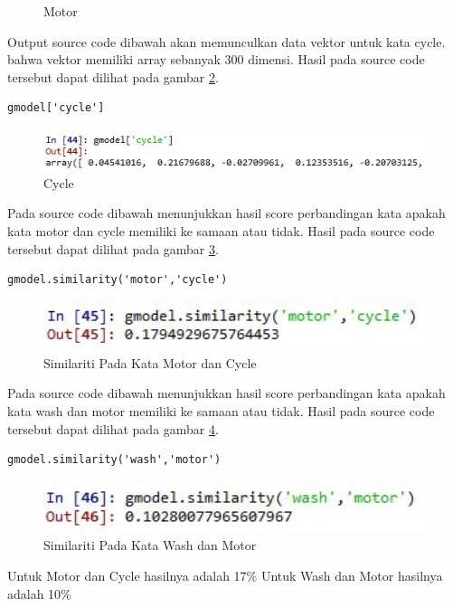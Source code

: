\begin{enumerate}
\begin{figure}[!htbp]
	\caption{Motor}
	\label{c5_16}
\end{figure}
\subitem Output source code dibawah akan memunculkan data vektor untuk kata cycle. bahwa vektor memiliki array sebanyak 300 dimensi. Hasil pada source code tersebut dapat dilihat pada gambar \ref{c5_17}.
\begin{verbatim}
gmodel['cycle']
\end{verbatim}
\begin{figure}[!htbp]
	\centerline{\includegraphics[width=1\textwidth]{figures/huda/chapter5/17.JPG}}
	\caption{Cycle}
	\label{c5_17}
\end{figure}
\subitem Pada source code dibawah menunjukkan hasil score perbandingan kata apakah kata motor dan cycle memiliki ke samaan atau tidak.  Hasil pada source code tersebut dapat dilihat pada gambar \ref{c5_18}.
\begin{verbatim}
gmodel.similarity('motor','cycle')
\end{verbatim}
\begin{figure}[!htbp]
	\centerline{\includegraphics[width=1\textwidth]{figures/huda/chapter5/18.JPG}}
	\caption{Similariti Pada Kata Motor dan Cycle}
	\label{c5_18}
\end{figure}
\subitem Pada source code dibawah menunjukkan hasil score perbandingan kata apakah kata wash dan motor memiliki ke samaan atau tidak.  Hasil pada source code tersebut dapat dilihat pada gambar \ref{c5_19}.
\begin{verbatim}
gmodel.similarity('wash','motor')
\end{verbatim}
\begin{figure}[!htbp]
	\centerline{\includegraphics[width=1\textwidth]{figures/huda/chapter5/19.JPG}}
	\caption{Similariti Pada Kata Wash dan Motor}
	\label{c5_19}
\end{figure}
\subitem Untuk Motor dan Cycle hasilnya adalah 17\%
\subitem Untuk Wash dan Motor hasilnya adalah 10\%

\end{enumerate}
